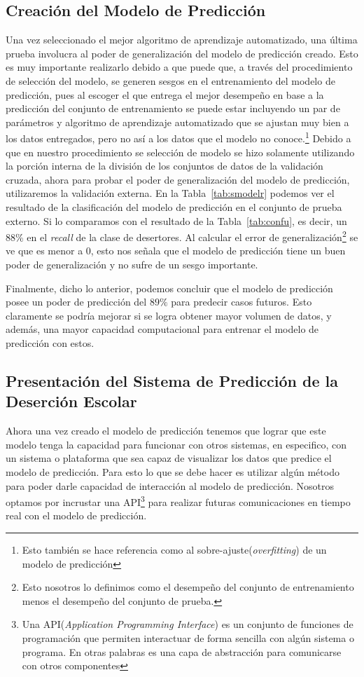 \subsection{Creación del Modelo de Predicción}
Una vez seleccionado el mejor algoritmo de aprendizaje automatizado, una última prueba involucra al poder de generalización del modelo de predicción creado. Esto es muy importante realizarlo debido a que puede que, a través del procedimiento de selección del modelo, se generen sesgos en el entrenamiento del modelo de predicción, pues al escoger el que entrega el mejor desempeño en base a la predicción del conjunto de entrenamiento se puede estar incluyendo un par de parámetros y algoritmo de aprendizaje automatizado que se ajustan muy bien a los datos entregados, pero no así a los datos que el modelo no conoce.\footnote{Esto también se hace referencia como al sobre-ajuste(\textit{overfitting}) de un modelo de predicción} Debido a que en nuestro procedimiento se selección de modelo se hizo solamente utilizando la porción interna de la división de los conjuntos de datos de la validación cruzada, ahora para probar el poder de generalización del modelo de predicción, utilizaremos la validación externa. En la Tabla~\ref{tab:smodelr} podemos ver el resultado de la clasificación del modelo de predicción en el conjunto de prueba externo.
Si lo comparamos con el resultado de la Tabla~\ref{tab:confu}, es decir, un 88\% en el \textit{recall} de la clase de desertores. Al calcular el error de generalización\footnote{Esto nosotros lo definimos como el desempeño del conjunto de entrenamiento menos el desempeño del conjunto de prueba.} se ve que es menor a 0, esto nos señala que el modelo de predicción tiene un buen poder de generalización y no sufre de un sesgo importante.

Finalmente, dicho lo anterior, podemos concluir que el modelo de predicción posee un poder de predicción del $89\%$ para predecir casos futuros. Esto claramente se podría mejorar si se logra obtener mayor volumen de datos, y además, una mayor capacidad computacional para entrenar el modelo de predicción con estos.
\subsection{Presentación del Sistema de Predicción de la Deserción Escolar}
Ahora una vez creado el modelo de predicción tenemos que lograr que este modelo tenga la capacidad para funcionar con otros sistemas, en especifico, con un sistema o plataforma que sea capaz de visualizar los datos que predice el modelo de predicción. Para esto lo que se debe hacer es utilizar algún método para poder darle capacidad de interacción al modelo de predicción. Nosotros optamos por incrustar una API\footnote{Una API(\textit{Application Programming Interface}) es un conjunto de funciones de programación que permiten interactuar de forma sencilla con algún sistema o programa. En otras palabras es una capa de abstracción para comunicarse con otros componentes} para realizar futuras comunicaciones en tiempo real con el modelo de predicción.

